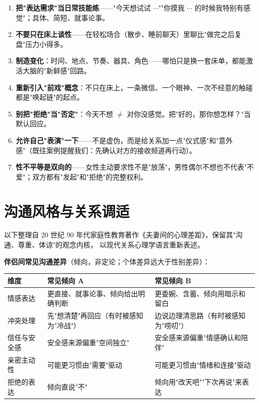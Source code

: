 \documentclass[12pt,UTF8,openany]{ctexbook}
\begin{document}
\begin{enumerate}[leftmargin=2em,itemsep=0.3em]
  \item \textbf{把"表达需求"当日常技能练}——"今天想试试 $\cdots$""你摸我 $\cdots$ 的时候我特别有感觉"；具体、简短、就事论事。
  \item \textbf{不要只在床上谈性}——在轻松场合（散步、睡前聊天）里聊比"做完之后复盘"压力小得多。
  \item \textbf{制造变化}：时间、地点、节奏、器具、角色——哪怕只是换一套床单，都能激活大脑的"新鲜感"回路。
  \item \textbf{重新引入"前戏"概念}：不只在床上，一条微信、一个眼神、一次不经意的触碰都是"唤起链"的起点。
  \item \textbf{别把"拒绝"当"否定"}：今天不想 $\ne$ 对你没感觉。把"好的，那你想怎样？"当默认回应。
  \item \textbf{允许自己"表演"一下}——不是虚伪，而是给关系加一点"仪式感"和"意外感"（既往案例提醒我们：先确认对方的接收频道再行动）。
  \item \textbf{性不平等是双向的}——女性主动要求性不是"放荡"，男性偶尔不想也不代表"不爱"；双方都有"发起"和"拒绝"的完整权利。
\end{enumerate}

\section{沟通风格与关系调适}

以下整理自 20 世纪 90 年代家庭性教育著作《夫妻间的心理差距》，保留其"沟通、尊重、体谅"的观念内核，
以现代关系心理学语言重新表述。

\textbf{伴侣间常见沟通差异}（倾向，非定论；个体差异远大于性别差异）：

\begin{tabularx}{\textwidth}{@{}l X X@{}}
\toprule
\textbf{维度} & \textbf{常见倾向 A} & \textbf{常见倾向 B} \\
\midrule
情感表达 & 更直接、就事论事、倾向给出明确判断 & 更委婉、含蓄、倾向用暗示和留白 \\
\midrule
冲突处理 & 先"想清楚"再回应（有时被感知为"冷战"） & 边说边理清思路（有时被感知为"唠叨"） \\
\midrule
信任与安全感 & 安全感来源偏重"空间独立" & 安全感来源偏重"情感确认和陪伴" \\
\midrule
亲密主动性 & 可能更习惯由"需要"驱动 & 可能更习惯由"情绪和连接"驱动 \\
\midrule
拒绝的表达 & 倾向直说"不" & 倾向用"改天吧""下次再说"来表达 \\
\bottomrule
\end{tabularx}
\end{document}
